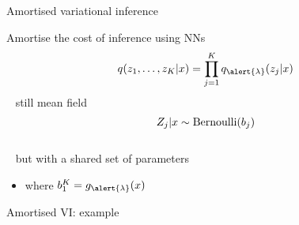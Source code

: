 \documentclass[14pt]{beamer}
\begin{document}
\begin{frame}{Amortised variational inference}

Amortise the cost of inference using NNs
\begin{equation*}
q(z_1, \ldots, z_K|x) = \prod_{j=1}^K q_{\alert{\lambda}}(z_j|x)
\end{equation*} \pause
~ still mean field
$$Z_j|x \sim \operatorname{Bernoulli}(b_j)$$\\  \pause
~ but with a shared set of parameters
\begin{itemize}
	\item where $b_1^K = g_{\alert{\lambda}}(x)$ 
\end{itemize}

\end{frame}


\begin{frame}{Amortised VI: example}
\begin{figure}
\center
{}
\end{figure}

\end{frame}
\end{document}
